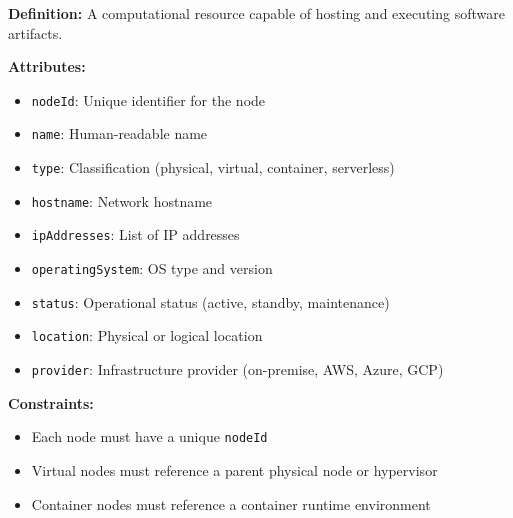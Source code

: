 \documentclass[11pt,letterpaper]{article}
\begin{document}
\begin{definitionbox}
\textbf{Definition:} A computational resource capable of hosting and executing software artifacts.

\textbf{Attributes:}
\begin{itemize}[nosep]
    \item \texttt{nodeId}: Unique identifier for the node
    \item \texttt{name}: Human-readable name
    \item \texttt{type}: Classification (physical, virtual, container, serverless)
    \item \texttt{hostname}: Network hostname
    \item \texttt{ipAddresses}: List of IP addresses
    \item \texttt{operatingSystem}: OS type and version
    \item \texttt{status}: Operational status (active, standby, maintenance)
    \item \texttt{location}: Physical or logical location
    \item \texttt{provider}: Infrastructure provider (on-premise, AWS, Azure, GCP)
\end{itemize}

\textbf{Constraints:}
\begin{itemize}[nosep]
    \item Each node must have a unique \texttt{nodeId}
    \item Virtual nodes must reference a parent physical node or hypervisor
    \item Container nodes must reference a container runtime environment
\end{itemize}
\end{definitionbox}
\end{document}
